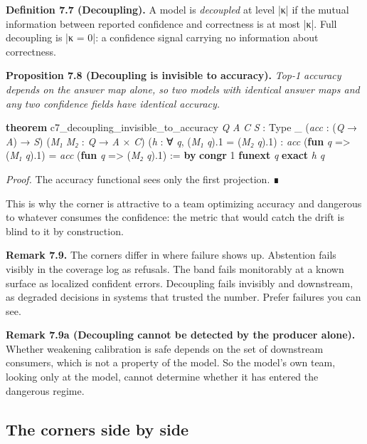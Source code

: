 \documentclass{memoir}
\begin{document}
\textbf{Definition 7.7 (Decoupling).} A model is \emph{decoupled} at level \LeanVerb|κ| if the mutual
information between reported confidence and correctness is at most \LeanVerb|κ|. Full
decoupling is \LeanVerb|κ = 0|: a confidence signal carrying no information about
correctness.

\textbf{Proposition 7.8 (Decoupling is invisible to accuracy).} \emph{Top-1 accuracy depends on
the answer map alone, so two models with identical answer maps and any two
confidence fields have identical accuracy.}

\begin{LeanVerbatim}
\textbf{theorem} c7_decoupling_invisible_to_accuracy
    \textit{Q} \textit{A} \textit{C} \textit{S} : Type _ (\textit{acc} : (\textit{Q} → \textit{A}) → \textit{S})
    (\textit{M₁} \textit{M₂} : \textit{Q} → \textit{A} × \textit{C})
    (\textit{h} : ∀ \textit{q}, (\textit{M₁} \textit{q}).1 = (\textit{M₂} \textit{q}).1) :
    \textit{acc} (\textbf{fun} \textit{q} => (\textit{M₁} \textit{q}).1) = \textit{acc} (\textbf{fun} \textit{q} => (\textit{M₂} \textit{q}).1) := \textbf{by}
  \textbf{congr} 1
  \textbf{funext} \textit{q}
  \textbf{exact} \textit{h} \textit{q}

\end{LeanVerbatim}


\emph{Proof.} The accuracy functional sees only the first projection. ∎

This is why the corner is attractive to a team optimizing accuracy and dangerous
to whatever consumes the confidence: the metric that would catch the drift is
blind to it by construction.

\textbf{Remark 7.9.} The corners differ in where failure shows up. Abstention fails visibly
in the coverage log as refusals. The band fails monitorably at a known surface
as localized confident errors. Decoupling fails invisibly and downstream, as
degraded decisions in systems that trusted the number. Prefer failures you can
see.

\textbf{Remark 7.9a (Decoupling cannot be detected by the producer alone).} Whether
weakening calibration is safe depends on the set of downstream consumers, which
is not a property of the model. So the model's own team, looking only at the
model, cannot determine whether it has entered the dangerous regime.



\subsection{The corners side by side}\label{Two--Schemas--of--Impossibility-005F-005F-005F--Machine--Checked--Limits--of--Trustworthy--Machine--Learning-005F-005F-005F--and--Why--They--Tighten--with--Capability----What--It--Means--for--AI--Safety----Three--relaxations-005F-005F-005F--three--cost--models----The--corners--side--by--side}
\end{document}
